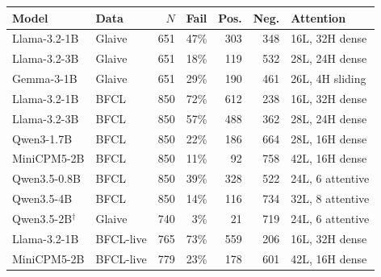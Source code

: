 \begin{tabular}{llrrrrl}
\toprule
Model & Data & $N$ & Fail & Pos. & Neg. & Attention \\
\midrule
Llama-3.2-1B & Glaive & 651 & 47\% & 303 & 348 & 16L, 32H dense \\
Llama-3.2-3B & Glaive & 651 & 18\% & 119 & 532 & 28L, 24H dense \\
Gemma-3-1B & Glaive & 651 & 29\% & 190 & 461 & 26L, 4H sliding \\
Llama-3.2-1B & BFCL & 850 & 72\% & 612 & 238 & 16L, 32H dense \\
Llama-3.2-3B & BFCL & 850 & 57\% & 488 & 362 & 28L, 24H dense \\
Qwen3-1.7B & BFCL & 850 & 22\% & 186 & 664 & 28L, 16H dense \\
MiniCPM5-2B & BFCL & 850 & 11\% & 92 & 758 & 42L, 16H dense \\
Qwen3.5-0.8B & BFCL & 850 & 39\% & 328 & 522 & 24L, 6 attentive \\
Qwen3.5-4B & BFCL & 850 & 14\% & 116 & 734 & 32L, 8 attentive \\
Qwen3.5-2B$^\dagger$ & Glaive & 740 & 3\% & 21 & 719 & 24L, 6 attentive \\
Llama-3.2-1B & BFCL-live & 765 & 73\% & 559 & 206 & 16L, 32H dense \\
MiniCPM5-2B & BFCL-live & 779 & 23\% & 178 & 601 & 42L, 16H dense \\
\bottomrule
\end{tabular}
